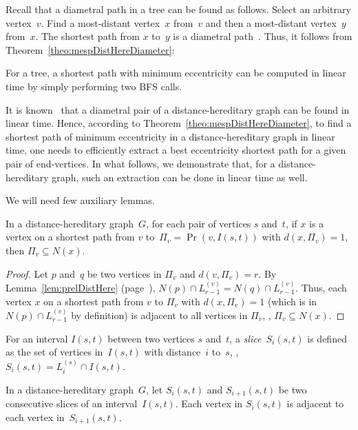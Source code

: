 Recall that a diametral path in a tree can be found as follows.
Select an arbitrary vertex~$v$.
Find a most-distant vertex~$x$ from~$v$ and then a most-distant vertex~$y$ from~$x$.
The shortest path from $x$ to~$y$ is a diametral path~\cite{Handler1973}.
Thus, it follows from Theorem~\ref{theo:mespDistHereDiameter}:

\begin{corollary}
    \label{cor:mespTrees}
For a tree, a shortest path with minimum eccentricity can be computed in linear time by simply performing two BFS calls.
\end{corollary}

It is known~\cite{DraganNicola2000} that a diametral pair of a distance-hereditary graph can be found in linear time.
Hence, according to Theorem~\ref{theo:mespDistHereDiameter}, to find a shortest path of minimum eccentricity in a distance-hereditary graph in linear time, one needs to efficiently extract a best eccentricity shortest path for a given pair of end-vertices.
In what follows, we demonstrate that, for a distance-hereditary graph, such an extraction can be done in linear time as well.

We will need few auxiliary lemmas.

\begin{lemma}
    \label{lem:dhgGateVertex}
In a distance-hereditary graph~\( G \), for each pair of vertices \( s \) and~\( t \), if \( x \) is a vertex on a shortest path from \( v \) to~\( \Pi_v = \Pr(v, I(s,t)) \) with \( d(x, \Pi_v) = 1 \), then \( \Pi_v \subseteq N(x) \).
\end{lemma}

\begin{proof}
Let $p$ and~$q$ be two vertices in $\Pi_v$ and $d(v, \Pi_v) = r$.
By Lemma~\ref{lem:prelDistHere} (page~\pageref{lem:prelDistHere}), $N(p) \cap L_{r-1}^{(v)} = N(q) \cap L_{r-1}^{(v)}$.
Thus, each vertex $x$ on a shortest path from $v$ to $\Pi_v$ with $d(x,\Pi_v) = 1$ (which is in $N(p) \cap L_{r-1}^{(v)}$ by definition) is adjacent to all vertices in $\Pi_v$, \ie, $\Pi_v \subseteq N(x)$.
\end{proof}

For an interval $I(s, t)$ between two vertices $s$ and~$t$, a \emph{slice~\( S_i(s, t) \)} is defined as the set of vertices in~$I(s, t)$ with distance~$i$ to~$s$, \ie, $S_i(s, t) = L_i^{(s)} \cap I(s, t)$.

\begin{lemma}
    \label{lem:dhgSliceJoin}
In a distance-hereditary graph~\( G \), let \( S_i(s, t) \) and \( S_{i+1}(s, t) \) be two consecutive slices of an interval~\( I(s, t) \).
Each vertex in \( S_i(s, t) \) is adjacent to each vertex in~\( S_{i+1}(s,t) \).
\end{lemma}

